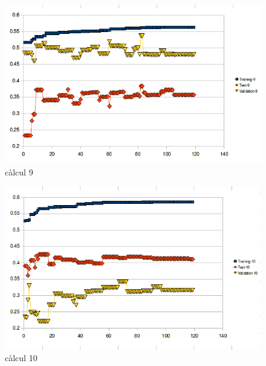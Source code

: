 \documentclass[titlepage,a4paper,12pt]{book}
\begin{document}
\begin{figure}[h]
\begin{center}
\includegraphics[scale=0.75]{pholus/pholus9.png}
\end{center}
\caption{càlcul 9}
\label{fig:pholusResult9}
\end{figure}

\begin{figure}[h]
\begin{center}
\includegraphics[scale=0.75]{pholus/pholus10.png}
\end{center}
\caption{càlcul 10}
\label{fig:pholusResult10}
\end{figure}

\end{document}
